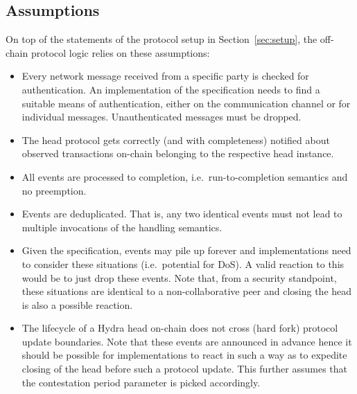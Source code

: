 \subsection{Assumptions}

On top of the statements of the protocol setup in Section~\ref{sec:setup}, the
off-chain protocol logic relies on these assumptions:
\begin{itemize}
	\item Every network message received from a specific party is checked for
	      authentication. An implementation of the specification needs to find a
	      suitable means of authentication, either on the communication channel
	      or for individual messages. Unauthenticated messages must be dropped.
	\item The head protocol gets correctly (and with completeness) notified about
	      observed transactions on-chain belonging to the respective head
	      instance.
	\item All events are processed to completion, i.e.\ run-to-completion semantics
	      and no preemption.
	\item Events are deduplicated. That is, any two identical events must not lead
	      to multiple invocations of the handling semantics.
	\item Given the specification, events may pile up forever and implementations
	      need to consider these situations (i.e.\ potential for DoS). A valid reaction
	      to this would be to just drop these events. Note that, from a security standpoint,
	      these situations are identical to a non-collaborative peer and closing the head
	      is also a possible reaction.
	\item The lifecycle of a Hydra head on-chain does not cross (hard fork)
	      protocol update boundaries. Note that these events are announced in
	      advance hence it should be possible for implementations to react in such
	      a way as to expedite closing of the head before such a protocol update.
	      This further assumes that the contestation period parameter is picked
	      accordingly.
\end{itemize}

